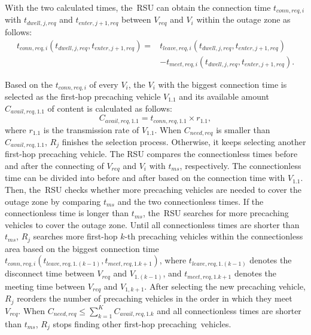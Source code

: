 \documentclass[electronics,aricle,accept,pdftex,moreauthors]{Definitions/mdpi}
\begin{document}
With the two calculated times, the~RSU can obtain the connection time $t_{conn,req,i}$ with $t_{dwell,j,req}$ and $t_{enter,j+1,req}$ between $V_{req}$ and $V_{i}$ within the outage zone as follows:
\begin{equation}
    \begin{split}
        t_{conn,req,i}(t_{dwell,j,req}, t_{enter,j+1,req}) = & t_{leave,req,i}(t_{dwell,j,req}, t_{enter,j+1,req}) \\
                        & - t_{meet,req,i}(t_{dwell,j,req}, t_{enter,j+1,req}).
    \end{split}
\end{equation}

Based on the $t_{conn,req,i}$ of every $V_{i}$, the $V_{i}$ with the biggest connection time is selected as the first-hop precaching vehicle $V_{1.1}$ and its available amount $C_{avail,req,1.1}$ of content is calculated as follows:
\begin{equation}
    C_{avail,req,1.1} = t_{conn,req,1.1} \times r_{1.1},
\end{equation}
where $r_{1.1}$ is the transmission rate of $V_{1.1}$.
When $C_{need,req}$ is smaller than $C_{avail,req,1.1}$, $R_{j}$ finishes the selection process.
Otherwise, it keeps selecting another first-hop precaching vehicle.
The RSU compares the connectionless times before and after the connecting of $V_{req}$ and $V_{i}$ with $t_{ms}$, respectively.
The connectionless time can be divided into before and after based on the connection time with $V_{1.1}$.
Then, the~RSU checks whether more precaching vehicles are needed to cover the outage zone by comparing $t_{ms}$ and the two connectionless times.
If the connectionless time is longer than $t_{ms}$, the~RSU searches for more precaching vehicles to cover the outage zone.
Until all connectionless times are shorter than $t_{ms}$, $R_{j}$ searches more first-hop $k$-th precaching vehicles within the connectionless area based on the biggest connection time $t_{conn,req,i}(t_{leave, req, 1.(k-1)}, t_{meet, req, 1.k+1})$, where $t_{leave, req, 1.(k-1)}$ denotes the disconnect time between $V_{req}$ and $V_{1.(k-1)}$, and $t_{meet, req, 1.k+1}$ denotes the meeting time between $V_{req}$ and $V_{1,k+1}$.
After selecting the new precaching vehicle, $R_{j}$ reorders the number of precaching vehicles in the order in which they meet $V_{req}$.
When $C_{need,req} \leq \sum^{K}_{k=1}{C_{avail,req,1.k}}$ and all connectionless times are shorter than $t_{ms}$, $R_{j}$ stops finding other first-hop precaching~vehicles.
\end{document}
